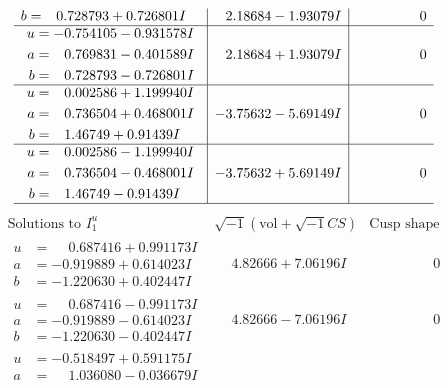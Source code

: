 \documentclass[1p]{elsarticle_modified}
\theoremstyle{definition}
\newcommand{\I}{\sqrt{-1}}
\begin{document}
$$\begin{array}{c|c|c}
\begin{aligned}
b &= \phantom{-}0.728793 + 0.726801 I\end{aligned}
 & \phantom{-}2.18684 - 1.93079 I & \phantom{-0.000000 } 0 \\ \hline\begin{aligned}
u &= -0.754105 - 0.931578 I \\
a &= \phantom{-}0.769831 - 0.401589 I \\
b &= \phantom{-}0.728793 - 0.726801 I\end{aligned}
 & \phantom{-}2.18684 + 1.93079 I & \phantom{-0.000000 } 0 \\ \hline\begin{aligned}
u &= \phantom{-}0.002586 + 1.199940 I \\
a &= \phantom{-}0.736504 + 0.468001 I \\
b &= \phantom{-}1.46749 + 0.91439 I\end{aligned}
 & -3.75632 - 5.69149 I & \phantom{-0.000000 } 0 \\ \hline\begin{aligned}
u &= \phantom{-}0.002586 - 1.199940 I \\
a &= \phantom{-}0.736504 - 0.468001 I \\
b &= \phantom{-}1.46749 - 0.91439 I\end{aligned}
 & -3.75632 + 5.69149 I & \phantom{-0.000000 } 0\\
 \hline 
 \end{array}$$\newpage$$\begin{array}{c|c|c}  
\text{Solutions to }I^u_{1}& \I (\text{vol} + \sqrt{-1}CS) & \text{Cusp shape}\\
 \hline 
\begin{aligned}
u &= \phantom{-}0.687416 + 0.991173 I \\
a &= -0.919889 + 0.614023 I \\
b &= -1.220630 + 0.402447 I\end{aligned}
 & \phantom{-}4.82666 + 7.06196 I & \phantom{-0.000000 } 0 \\ \hline\begin{aligned}
u &= \phantom{-}0.687416 - 0.991173 I \\
a &= -0.919889 - 0.614023 I \\
b &= -1.220630 - 0.402447 I\end{aligned}
 & \phantom{-}4.82666 - 7.06196 I & \phantom{-0.000000 } 0 \\ \hline\begin{aligned}
u &= -0.518497 + 0.591175 I \\
a &= \phantom{-}1.036080 - 0.036679 I \\

\end{aligned}
\end{array}$$
\end{document}
